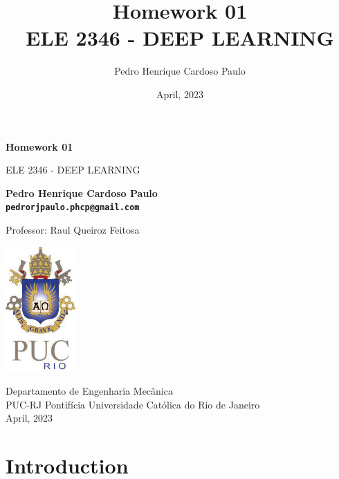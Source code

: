 \documentclass[10pt, a4paper]{article}
\begin{document}
\def\TITLE{Homework 01}
\def\DISCIPLINE{ELE 2346 - DEEP LEARNING}
\def\PROFESSOR{Raul Queiroz Feitosa}
\def\AUTHOR{Pedro Henrique Cardoso Paulo}
\def\CONTACT{pedrorjpaulo.phcp@gmail.com}
\def\DATE{April, 2023}

\title{\textbf{\TITLE} \\ \DISCIPLINE}
\author{\AUTHOR}
\date{\DATE}

\begin{titlepage}
      \begin{center}
          \vspace*{1cm}

          \Huge
          \textbf{\TITLE}

          \vspace{0.5cm}
          \LARGE
          \DISCIPLINE

          \vspace{1.5cm}

          \textbf{\AUTHOR \\ {\tt \CONTACT}}

          \vfill
          Professor: \PROFESSOR

          \vspace{0.8cm}

          \includegraphics[width=0.2\textwidth]{../general/puc.jpg}

          \Large
          Departamento de Engenharia Mecânica\\
          PUC-RJ Pontifícia Universidade Católica do Rio de Janeiro\\
          \DATE

      \end{center}
  \end{titlepage}

\maketitle

\section{Introduction}
\end{document}

